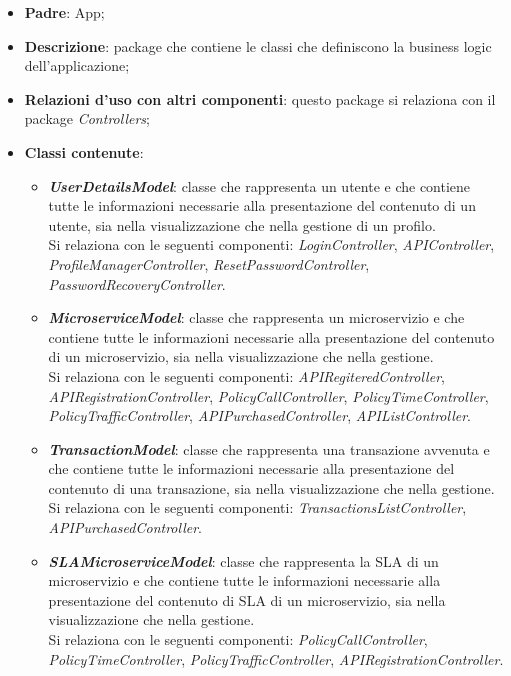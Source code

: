 \begin{itemize}
	\item \textbf{Padre}: App;
	
	\item \textbf{Descrizione}: package che contiene le classi che definiscono la business logic dell'applicazione;
	
	\item \textbf{Relazioni d’uso con altri componenti}: questo package si relaziona con il package \textit{Controllers};
	
	\item \textbf{Classi contenute}:
	\begin{itemize}
		\item \textbf{\textit{UserDetailsModel}}: classe che rappresenta un utente e che contiene tutte le informazioni necessarie alla presentazione del contenuto di un utente, sia nella visualizzazione che nella gestione di un profilo.\\
		Si relaziona con le seguenti componenti: \textit{LoginController}, \textit{APIController}, \textit{ProfileManagerController}, \textit{ResetPasswordController}, \textit{PasswordRecoveryController}.
		
		\item \textbf{\textit{MicroserviceModel}}: classe che rappresenta un microservizio e che contiene tutte le informazioni necessarie alla presentazione del contenuto di un microservizio, sia nella visualizzazione che nella gestione.\\
		Si relaziona con le seguenti componenti: \textit{APIRegiteredController}, \textit{APIRegistrationController}, \textit{PolicyCallController}, \textit{PolicyTimeController}, \textit{PolicyTrafficController}, \textit{APIPurchasedController}, \textit{APIListController}.
		
		\item \textbf{\textit{TransactionModel}}:  classe che rappresenta una transazione avvenuta e che contiene tutte le informazioni necessarie alla presentazione del contenuto di una transazione, sia nella visualizzazione che nella gestione.\\
		Si relaziona con le seguenti componenti: \textit{TransactionsListController}, \textit{APIPurchasedController}.
		
		\item \textbf{\textit{SLAMicroserviceModel}}:  classe che rappresenta la SLA di un microservizio e che contiene tutte le informazioni necessarie alla presentazione del contenuto di SLA di un microservizio, sia nella visualizzazione che nella gestione.\\
		Si relaziona con le seguenti componenti: \textit{PolicyCallController}, \textit{PolicyTimeController}, \textit{PolicyTrafficController}, \textit{APIRegistrationController}.
	\end{itemize}
\end{itemize}

